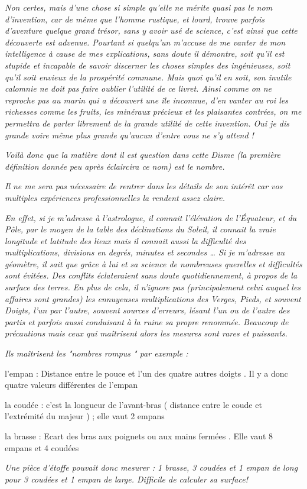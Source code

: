 \begin{His}
\textit{Non certes, mais d'une chose si simple qu'elle ne mérite quasi pas le nom d'invention, car de même que  l'homme rustique, et lourd, trouve parfois d'aventure quelque grand trésor, sans y avoir usé de science, c'est  ainsi que cette découverte est advenue. Pourtant si quelqu'un m'accuse de me  vanter de mon intelligence à cause de  mes explications, sans doute il démontre, soit qu'il est stupide  et incapable de savoir discerner les choses simples des ingénieuses, soit  qu'il soit envieux de la prospérité commune. Mais quoi qu'il en soit, son inutile calomnie ne doit pas faire oublier l'utilité de ce livret. Ainsi comme on ne reproche pas au marin qui a découvert une île inconnue, d'en vanter au roi les richesses comme les fruits, les minéraux précieux et les plaisantes contrées, on me permettra de parler librement de la grande utilité de cette invention. Oui je dis grande voire même plus grande qu'aucun d'entre vous ne s'y attend !}

\textit{Voilà donc que la matière dont il est question dans cette Disme (la première définition donnée peu après éclaircira ce nom) est le nombre.}

\textit{Il ne me sera pas nécessaire de rentrer dans les détails de son intérêt car vos multiples expériences professionnelles la rendent  assez claire.}

\textit{En effet, si je m'adresse à l'astrologue, il connait l'élévation de l'Équateur, et du Pôle, par le moyen de la table des déclinations du Soleil, il connait la vraie longitude et latitude des lieux mais il connait aussi la difficulté des multiplications, divisions en degrés, minutes et secondes …
Si je m'adresse au géomètre, il sait  que grâce à lui et sa science de nombreuses querelles et difficultés sont évitées. Des conflits éclateraient sans doute quotidiennement, à propos de la  surface des terres. En plus de cela,  il n'ignore pas (principalement celui auquel les affaires sont grandes) les ennuyeuses multiplications des Verges, Pieds, et souvent Doigts, l'un par l'autre, souvent sources d'erreurs, lésant l'un ou de l'autre des partis et parfois aussi conduisant à la ruine sa propre renommée. Beaucoup de précautions mais ceux qui maîtrisent alors les mesures sont rares et puissants.}

\vspace{0.2cm}

\textit{Ils maîtrisent les "nombres rompus " par exemple :}

\begin{description}
\item l'empan : Distance entre le pouce et l'un des quatre autres doigts . Il y a donc quatre valeurs différentes de l'empan
\item la coudée : c'est la longueur de l'avant-bras ( distance entre le coude et l'extrémité du majeur ) ; elle vaut 2 empans
\item la brasse : Ecart des bras aux poignets ou aux mains fermées . Elle vaut 8 empans et 4 coudées
\end{description}
\textit{Une pièce d'étoffe pouvait donc mesurer : 1 brasse, 3 coudées et 1 empan de long pour 3 coudées et 1 empan de large.
Difficile de calculer sa surface!}


\end{His}

